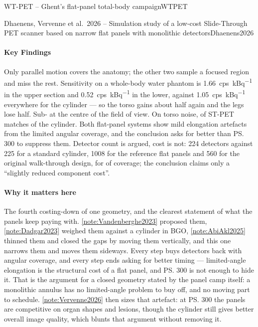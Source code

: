 \begin{programnote}{WT-PET -- Ghent's flat-panel total-body campaign}{WTPET}
\begin{papernote}{Dhaenens, Vervenne et al.\ 2026 -- Simulation study of a low-cost Slide-Through PET scanner based on narrow flat panels with monolithic detectors}{Dhaenens2026}
\paragraph{Key Findings}
Only parallel motion covers the anatomy; the other two sample a focused region
and miss the rest. Sensitivity on a whole-body water phantom is
\qty{1.66}{cps\per\kilo\becquerel} in the upper section and
\qty{0.52}{cps\per\kilo\becquerel} in the lower, against
\qty{1.05}{cps\per\kilo\becquerel} everywhere for the cylinder --- so the
torso gains about half again and the legs lose half. Sub- at the centre
of the field of view. On torso noise,  of ST-PET matches 
of the cylinder. Both flat-panel systems show mild elongation artefacts from
the limited angular coverage, and the conclusion asks for better than \ps{300}
to suppress them.
Detector count is argued, cost is not: 224 detectors against 225 for a
standard cylinder, 1008 for the reference flat panels and 560 for the
original walk-through design, for  of coverage; the conclusion claims
only a ``slightly reduced component cost''.

\paragraph{Why it matters here}
The fourth costing-down of one geometry, and the clearest statement of what
the panels keep paying with. \ref{note:Vandenberghe2023} proposed them,
\ref{note:Dadgar2023} weighed them against a cylinder in BGO,
\ref{note:AbiAkl2025} thinned them and closed the gaps by moving them
vertically, and this one narrows them and moves them sideways. Every step buys
detectors back with angular coverage, and every step ends asking for better
timing --- limited-angle elongation is the structural cost of a flat panel, and
\ps{300} is not enough to hide it. That is the argument for a closed geometry
stated by the panel camp itself: a monolithic annulus has no limited-angle
problem to buy off, and no moving part to schedule.
\ref{note:Vervenne2026} then sizes that artefact: at \ps{300} the panels are
competitive on organ shapes and lesions, though the cylinder still gives better
overall image quality, which blunts that argument without removing it.


\end{papernote}
\end{programnote}
